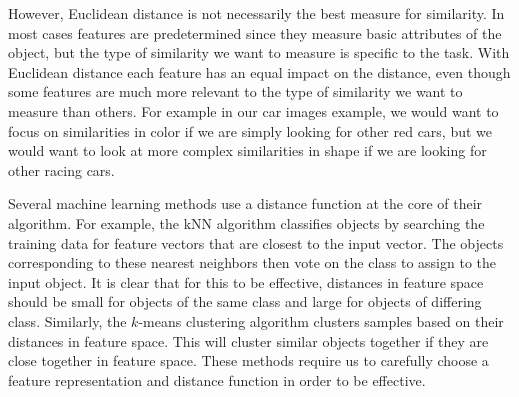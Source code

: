 However, Euclidean distance is not necessarily the best measure for similarity. In most cases features are predetermined since they measure basic attributes of the object, but the type of similarity we want to measure is specific to the task. With Euclidean distance each feature has an equal impact on the distance, even though some features are much more relevant to the type of similarity we want to measure than others. For example in our car images example, we would want to focus on similarities in color if we are simply looking for other red cars, but we would want to look at more complex similarities in shape if we are looking for other racing cars. 

Several machine learning methods use a distance function at the core of their algorithm. For example, the \ac{kNN} algorithm classifies objects by searching the training data for feature vectors that are closest to the input vector. The objects corresponding to these nearest neighbors then vote on the class to assign to the input object. It is clear that for this to be effective, distances in feature space should be small for objects of the same class and large for objects of differing class. Similarly, the $k$-means clustering algorithm clusters samples based on their distances in feature space. This will cluster similar objects together if they are close together in feature space. These methods require us to carefully choose a feature representation and distance function in order to be effective.

